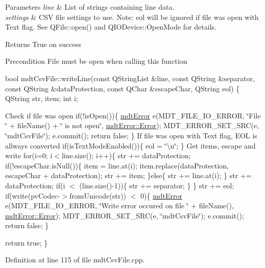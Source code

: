 \begin{DoxyParams}{Parameters}
{\em line} & List of strings containing line data. \\
\hline
{\em settings} & C\-S\-V file settings to use. Note\-: eol will be ignored if file was open with Text flag. See Q\-File\-::open() and Q\-I\-O\-Device\-::\-Open\-Mode for details. \\
\hline
\end{DoxyParams}
\begin{DoxyReturn}{Returns}
True on success 
\end{DoxyReturn}
\begin{DoxyPrecond}{Precondition}
File must be open when calling this function
\end{DoxyPrecond}
bool mdt\-Csv\-File\-::write\-Line(const Q\-String\-List \&line, const Q\-String \&separator, const Q\-String \&data\-Protection, const Q\-Char \&escape\-Char, Q\-String eol) \{ Q\-String str, item; int i;

Check if file was open if(!is\-Open())\{ \hyperlink{classmdt_error}{mdt\-Error} e(M\-D\-T\-\_\-\-F\-I\-L\-E\-\_\-\-I\-O\-\_\-\-E\-R\-R\-O\-R, \char`\"{}\-File \char`\"{} + file\-Name() + \char`\"{} is not open\char`\"{}, \hyperlink{classmdt_error_a5c8b1a040e2feaa848f6201d6b6f0cd7a35f5c05a7d15b6433445cdbffa6d5260}{mdt\-Error\-::\-Error}); M\-D\-T\-\_\-\-E\-R\-R\-O\-R\-\_\-\-S\-E\-T\-\_\-\-S\-R\-C(e, \char`\"{}mdt\-Csv\-File\char`\"{}); e.\-commit(); return false; \} If file was open with Text flag, E\-O\-L is allways converted if(is\-Text\-Mode\-Enabled())\{ eol = \char`\"{}\textbackslash{}n\char`\"{}; \} Get items, escape and write for(i=0; i$<$line.\-size(); i++)\{ str += data\-Protection; if(!escape\-Char.is\-Null())\{ item = line.\-at(i); item.\-replace(data\-Protection, escape\-Char + data\-Protection); str += item; \}else\{ str += line.\-at(i); \} str += data\-Protection; if(i $<$ (line.\-size()-\/1))\{ str += separator; \} \} str += eol; if(write(pv\-Codec-\/$>$from\-Unicode(str)) $<$ 0)\{ \hyperlink{classmdt_error}{mdt\-Error} e(M\-D\-T\-\_\-\-F\-I\-L\-E\-\_\-\-I\-O\-\_\-\-E\-R\-R\-O\-R, \char`\"{}\-Write error occured on file \char`\"{} + file\-Name(), \hyperlink{classmdt_error_a5c8b1a040e2feaa848f6201d6b6f0cd7a35f5c05a7d15b6433445cdbffa6d5260}{mdt\-Error\-::\-Error}); M\-D\-T\-\_\-\-E\-R\-R\-O\-R\-\_\-\-S\-E\-T\-\_\-\-S\-R\-C(e, \char`\"{}mdt\-Csv\-File\char`\"{}); e.\-commit(); return false; \}

return true; \} 

Definition at line 115 of file mdt\-Csv\-File.\-cpp.



